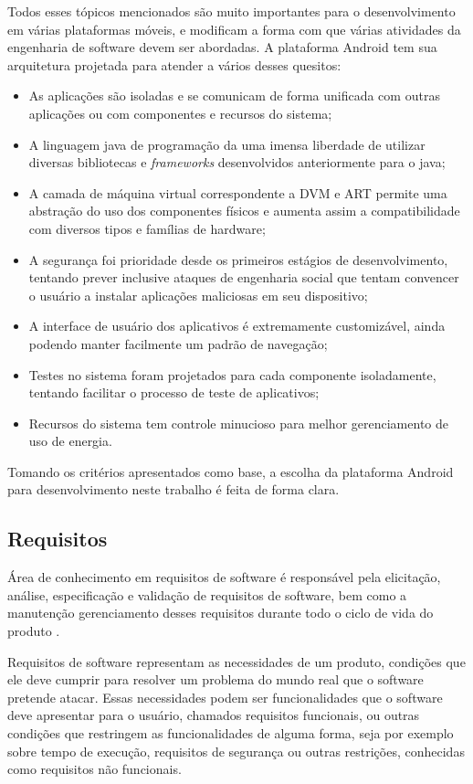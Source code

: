 Todos esses tópicos mencionados são muito importantes para o desenvolvimento em várias plataformas móveis, e modificam a forma com que várias atividades da engenharia de software devem ser abordadas. A plataforma Android tem sua arquitetura projetada para atender a vários desses quesitos:
\begin{itemize}
\item As aplicações são isoladas e se comunicam de forma unificada com outras aplicações ou com componentes e recursos do sistema;
\item A linguagem java de programação da uma imensa liberdade de utilizar diversas bibliotecas e \textit{frameworks} desenvolvidos anteriormente para o java;
\item A camada de máquina virtual correspondente a DVM e ART permite uma abstração do uso dos componentes físicos e aumenta assim a compatibilidade com diversos tipos e famílias de hardware;
\item A segurança foi prioridade desde os primeiros estágios de desenvolvimento, tentando prever inclusive ataques de engenharia social que tentam convencer o usuário a instalar aplicações maliciosas em seu dispositivo;
\item A interface de usuário dos aplicativos é extremamente customizável, ainda podendo manter facilmente um padrão de navegação;
\item Testes no sistema foram projetados para cada componente isoladamente, tentando facilitar o processo de teste de aplicativos;
\item Recursos do sistema tem controle minucioso para melhor gerenciamento de uso de energia.
\end{itemize}

Tomando os critérios apresentados como base, a escolha da plataforma Android para desenvolvimento neste trabalho é feita de forma clara.

\subsection{Requisitos}

Área de conhecimento em requisitos de software é responsável pela elicitação, análise, especificação e validação de requisitos de software, bem como a manutenção gerenciamento desses requisitos durante todo o ciclo de vida do produto \cite{swebok}.

Requisitos de software representam as necessidades de um produto, condições que ele deve cumprir para resolver um problema do mundo real que o software pretende atacar. Essas necessidades podem ser funcionalidades que o software deve apresentar para o usuário, chamados requisitos funcionais, ou outras condições que restringem as funcionalidades de alguma forma, seja por exemplo sobre tempo de execução, requisitos de segurança ou outras restrições, conhecidas como requisitos não funcionais.

